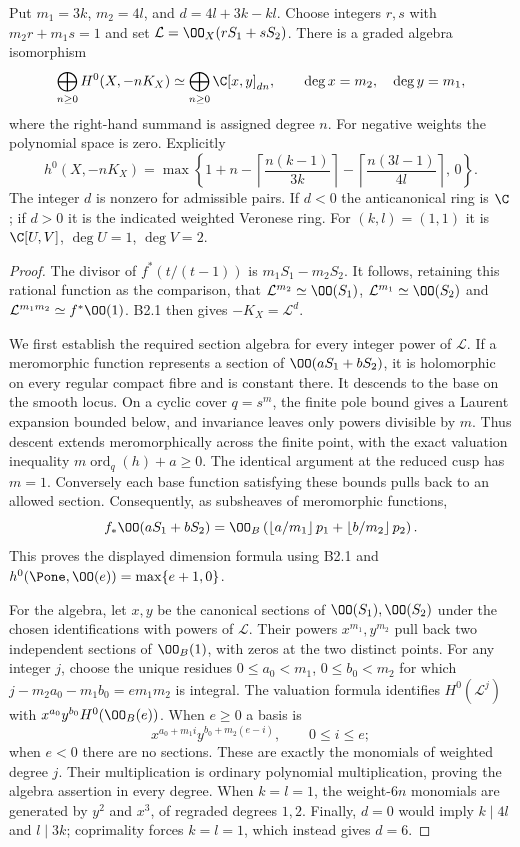\begin{proposition}\label{inv:B2.2}
Put $m_1=3k$, $m_2=4l$, and $d=4l+3k-kl$.
Choose integers $r,s$ with $m_2r+m_1s=1$ and set
$\mathcal L=\OO_X(rS_1+sS_2)$.
There is a graded algebra isomorphism
\[
\bigoplus_{n\ge0}H^0(X,-nK_X)
\simeq\bigoplus_{n\ge0}\C[x,y]_{dn},
\qquad\deg x=m_2,\quad\deg y=m_1,
\]
where the right-hand summand is assigned degree $n$.
For negative weights the polynomial space is zero. Explicitly
\[
h^0(X,-nK_X)=
\max\left\{1+n-\left\lceil\frac{n(k-1)}{3k}\right\rceil
-\left\lceil\frac{n(3l-1)}{4l}\right\rceil,\,0\right\}.
\]
The integer $d$ is nonzero for admissible pairs. If $d<0$ the
anticanonical ring is $\C$; if $d>0$ it is the indicated weighted
Veronese ring. For $(k,l)=(1,1)$ it is
$\C[U,V]$, $\deg U=1$, $\deg V=2$.
\end{proposition}
\begin{proof}
The divisor of $f^*(t/(t-1))$ is $m_1S_1-m_2S_2$.
It follows, retaining this rational function as the comparison, that
$\mathcal L^{m_2}\simeq\OO(S_1)$,
$\mathcal L^{m_1}\simeq\OO(S_2)$ and
$\mathcal L^{m_1m_2}\simeq f^*\OO(1)$.
B2.1 then gives $-K_X=\mathcal L^d$.

We first establish the required section algebra for every integer
power of $\mathcal L$. If a meromorphic function represents a section
of $\OO(aS_1+bS_2)$, it is holomorphic on every regular compact fibre
and is constant there. It descends to the base on the smooth locus.
On a cyclic cover $q=s^m$, the finite pole bound gives a Laurent
expansion bounded below, and invariance leaves only powers divisible
by $m$. Thus descent extends meromorphically across the finite point,
with the exact valuation inequality $m\operatorname{ord}_q(h)+a\ge0$.
The identical argument at the reduced cusp has $m=1$.
Conversely each base function satisfying these bounds pulls back to
an allowed section. Consequently, as subsheaves of meromorphic functions,
\[
f_*\OO(aS_1+bS_2)=
\OO_B\left(\left\lfloor a/m_1\right\rfloor p_1+
\left\lfloor b/m_2\right\rfloor p_2\right).
\]
This proves the displayed dimension formula using B2.1 and
$h^0(\Pone,\OO(e))=\max\{e+1,0\}$.

For the algebra, let $x,y$ be the canonical sections of
$\OO(S_1),\OO(S_2)$ under the chosen identifications with powers of
$\mathcal L$. Their powers $x^{m_1},y^{m_2}$ pull back two independent
sections of $\OO_B(1)$, with zeros at the two distinct points.
For any integer $j$, choose the unique residues
$0\le a_0<m_1$, $0\le b_0<m_2$ for which
$j-m_2a_0-m_1b_0=e m_1m_2$ is integral.
The valuation formula identifies $H^0(\mathcal L^j)$ with
$x^{a_0}y^{b_0}H^0(\OO_B(e))$. When $e\ge0$ a basis is
\[
x^{a_0+m_1i}y^{b_0+m_2(e-i)},\qquad0\le i\le e;
\]
when $e<0$ there are no sections. These are exactly the monomials of
weighted degree $j$. Their multiplication is ordinary polynomial
multiplication, proving the algebra assertion in every degree.
When $k=l=1$, the weight-$6n$ monomials are generated by $y^2$ and
$x^3$, of regraded degrees $1,2$.
Finally, $d=0$ would imply $k\mid4l$ and $l\mid3k$; coprimality
forces $k=l=1$, which instead gives $d=6$.
\end{proof}

